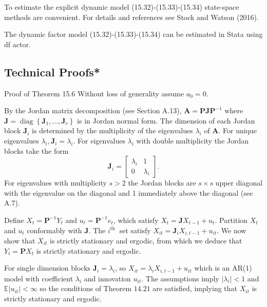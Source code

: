 \documentclass[10pt]{article}
\begin{document}
To estimate the explicit dynamic model (15.32)-(15.33)-(15.34) state-space methods are convenient. For details and references see Stock and Watson (2016).

The dynamic factor model (15.32)-(15.33)-(15.34) can be estimated in Stata using df actor.

\subsection{Technical Proofs*}
Proof of Theorem 15.6 Without loss of generality assume $a_{0}=0$.

By the Jordan matrix decomposition (see Section A.13), $\boldsymbol{A}=\boldsymbol{P} \boldsymbol{J} \boldsymbol{P}^{-1}$ where $\boldsymbol{J}=\operatorname{diag}\left\{\boldsymbol{J}_{1}, \ldots, \boldsymbol{J}_{r}\right\}$ is in Jordan normal form. The dimension of each Jordan block $\boldsymbol{J}_{i}$ is determined by the multiplicity of the eigenvalues $\lambda_{i}$ of $\boldsymbol{A}$. For unique eigenvalues $\lambda_{i}, \boldsymbol{J}_{i}=\lambda_{i}$. For eigenvalues $\lambda_{i}$ with double multiplicity the Jordan blocks take the form
$$
\boldsymbol{J}_{i}=\left[\begin{array}{cc}
\lambda_{i} & 1 \\
0 & \lambda_{i}
\end{array}\right] .
$$
For eigenvalues with multiplicity $s>2$ the Jordan blocks are $s \times s$ upper diagonal with the eigenvalue on the diagonal and 1 immediately above the diagonal (see A.7).

Define $X_{t}=\boldsymbol{P}^{-1} Y_{t}$ and $u_{t}=\boldsymbol{P}^{-1} e_{t}$, which satisfy $X_{t}=\boldsymbol{J} X_{t-1}+u_{t}$. Partition $X_{t}$ and $u_{t}$ conformably with $\boldsymbol{J}$. The $i^{\text {th }}$ set satisfy $X_{i t}=\boldsymbol{J}_{i} X_{i, t-1}+u_{i t}$. We now show that $X_{i t}$ is strictly stationary and ergodic, from which we deduce that $Y_{t}=\boldsymbol{P} X_{t}$ is strictly stationary and ergodic.

For single dimension blocks $\boldsymbol{J}_{i}=\lambda_{i}$, so $X_{i t}=\lambda_{i} X_{i, t-1}+u_{i t}$ which is an AR(1) model with coefficient $\lambda_{i}$ and innovation $u_{i t}$. The assumptions imply $\left|\lambda_{i}\right|<1$ and $\mathbb{E}\left|u_{i t}\right|<\infty$ so the conditions of Theorem $14.21$ are satisfied, implying that $X_{i t}$ is strictly stationary and ergodic.
\end{document}
